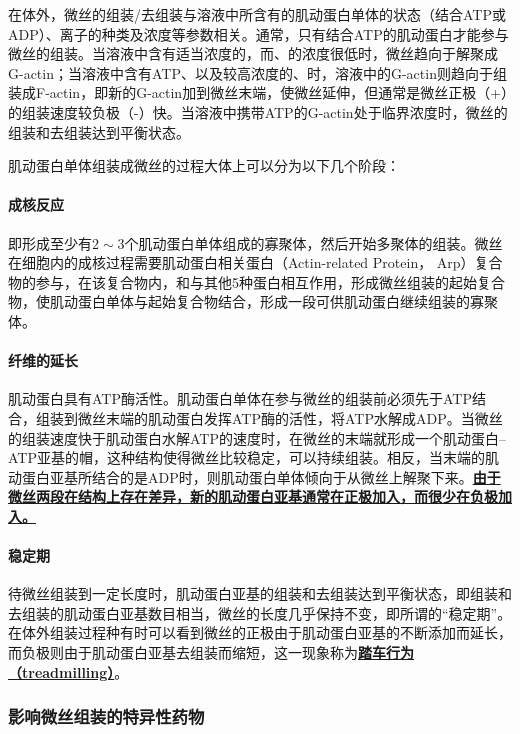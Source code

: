 在体外，微丝的组装/去组装与溶液中所含有的肌动蛋白单体的状态（结合ATP或ADP）、离子的种类及浓度等参数相关。通常，只有结合ATP的肌动蛋白才能参与微丝的组装。当溶液中含有适当浓度的，而、的浓度很低时，微丝趋向于解聚成G-actin；当溶液中含有ATP、以及较高浓度的、时，溶液中的G-actin则趋向于组装成F-actin，即新的G-actin加到微丝末端，使微丝延伸，但通常是微丝正极（+）的组装速度较负极（-）快。当溶液中携带ATP的G-actin处于临界浓度时，微丝的组装和去组装达到平衡状态。

肌动蛋白单体组装成微丝的过程大体上可以分为以下几个阶段：

\paragraph{成核反应}
即形成至少有$ 2 \sim 3 $个肌动蛋白单体组成的寡聚体，然后开始多聚体的组装。微丝在细胞内的成核过程需要肌动蛋白相关蛋白（Actin-related Protein， Arp）复合物的参与，在该复合物内，和与其他5种蛋白相互作用，形成微丝组装的起始复合物，使肌动蛋白单体与起始复合物结合，形成一段可供肌动蛋白继续组装的寡聚体。

\paragraph{纤维的延长}

肌动蛋白具有ATP酶活性。肌动蛋白单体在参与微丝的组装前必须先于ATP结合，组装到微丝末端的肌动蛋白发挥ATP酶的活性，将ATP水解成ADP。当微丝的组装速度快于肌动蛋白水解ATP的速度时，在微丝的末端就形成一个肌动蛋白--ATP亚基的帽，这种结构使得微丝比较稳定，可以持续组装。相反，当末端的肌动蛋白亚基所结合的是ADP时，则肌动蛋白单体倾向于从微丝上解聚下来。\textbf{\underline{由于微丝两段在结构上存在差异，新的肌动蛋白亚基通常在正极加入，而很少在负极加入。}}

\paragraph{稳定期}

待微丝组装到一定长度时，肌动蛋白亚基的组装和去组装达到平衡状态，即组装和去组装的肌动蛋白亚基数目相当，微丝的长度几乎保持不变，即所谓的``稳定期''。在体外组装过程种有时可以看到微丝的正极由于肌动蛋白亚基的不断添加而延长，而负极则由于肌动蛋白亚基去组装而缩短，这一现象称为\textbf{\underline{踏车行为（treadmilling）}}。

\subsubsection{影响微丝组装的特异性药物}

